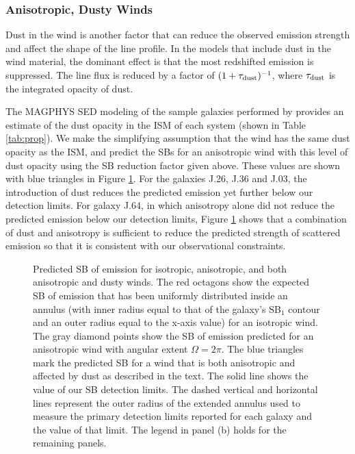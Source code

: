 \documentclass[twocolumn]{aastex62}
\begin{document}
\subsubsection{Anisotropic, Dusty Winds}

Dust in the wind is another factor that can reduce the observed emission strength and affect the shape of the  line profile. 
In the \cite{Prochaska_2011} models that include dust in the wind material, the dominant effect is that the most redshifted emission is suppressed. The line flux is reduced by a factor of $(1+\tau_{\rm{dust}})^{-1}$, where $\tau_{\rm{dust}}$ is the integrated opacity of dust. 

The MAGPHYS SED modeling of the sample galaxies performed by \cite{Rubin_2014} provides an
estimate of the dust opacity in the ISM of each system (shown in Table \ref{tab:prop}). %
We make the simplifying assumption
that the wind has the same dust opacity as the ISM, and predict the SBs for an anisotropic wind with this level of dust opacity using the SB reduction factor given above.  These values are shown with blue triangles in Figure \ref{fig.emission}.
For the galaxies J.26, J.36 and J.03, the introduction of dust reduces the predicted emission yet further below our detection limits. For galaxy J.64, in which anisotropy alone did not reduce the predicted emission below our detection limits, Figure \ref{fig.emission} shows that a combination of dust and anisotropy is sufficient to reduce the predicted strength of scattered emission %
so that it is consistent with our observational constraints.

\begin{figure}[h]
\centering
{}
\caption{Predicted SB of  emission for isotropic, anisotropic, and both anisotropic and dusty winds. The red octagons show the expected SB of emission that has been uniformly distributed inside an annulus (with inner radius equal to that of the galaxy's SB$_1$ contour and an outer radius equal to the x-axis value) for an isotropic wind. The gray diamond points show the SB of  emission predicted for an anisotropic wind with angular extent $\Omega=2\pi$. The blue triangles mark the predicted SB for a wind that is both anisotropic and affected by dust as described in the text. The solid line shows the value of our SB detection limits. The dashed vertical and horizontal lines represent the outer radius of the extended annulus used to measure the primary detection limits reported for each galaxy and the value of that limit. The legend in panel (b) holds for the remaining panels.}
\label{fig.emission}
\end{figure}
\end{document}
